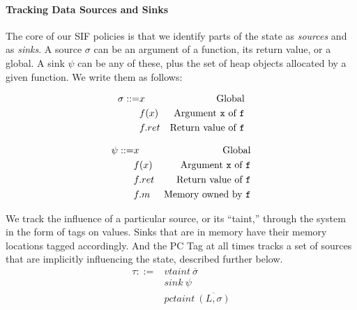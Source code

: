 \documentclass[acmsmall,review,anonymous]{acmart}\settopmatter{printfolios=true,printccs=false,printacmref=false}
\begin{document}
\paragraph*{Tracking Data Sources and Sinks}

The core of our SIF policies is that we identify parts of the state as {\em sources} and as {\em sinks}.
A source \(\sigma\) can be an argument of a function, its return value, or a global.
A sink \(\psi\) can be any of these, plus the set of heap objects allocated by a given function.
We write them as follows:

\begin{minipage}{0.5\textwidth}
  \[\begin{aligned}
  \sigma ::= & x & \textnormal{Global} \\
  & f(x) & \textnormal{Argument {\tt x} of {\tt f}} \\
  & f.ret & \textnormal{Return value of {\tt f}} \\
  \end{aligned}\]
\end{minipage}
\begin{minipage}{0.5\textwidth}
  \[\begin{aligned}
  \psi ::= & x & \textnormal{Global} \\
  & f(x) & \textnormal{Argument {\tt x} of {\tt f}} \\
  & f.ret & \textnormal{Return value of {\tt f}} \\
  & f.m & \textnormal{Memory owned by {\tt f}} \\
  \end{aligned}\]
\end{minipage}

We track the influence of a particular source, or its ``taint,'' through the system in the form
of tags on values. Sinks that are in memory have their memory locations tagged accordingly. And
the PC Tag at all times tracks a set of sources that are implicitly influencing the state, described
further below.
%
\begin{align*}
  \tau ::= & \mathit{vtaint} ~ \overline{\sigma} \\
  & \mathit{sink} ~ \psi \\
  & \mathit{pctaint} ~ \overline{(L,\sigma)} \\
\end{align*}
%


\end{document}
